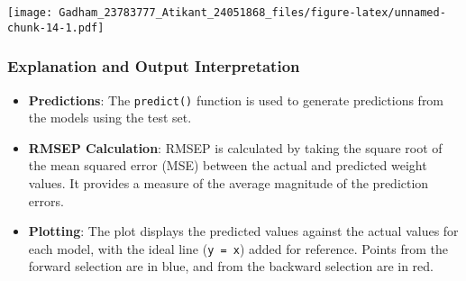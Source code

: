 \documentclass[
]{article}
\newenvironment{Shaded}{\begin{snugshade}}{\end{snugshade}}
\newcommand{\AttributeTok}[1]{\textcolor[rgb]{0.13,0.29,0.53}{#1}}
\newcommand{\CommentTok}[1]{\textcolor[rgb]{0.56,0.35,0.01}{\textit{#1}}}
\newcommand{\DecValTok}[1]{\textcolor[rgb]{0.00,0.00,0.81}{#1}}
\newcommand{\FunctionTok}[1]{\textcolor[rgb]{0.13,0.29,0.53}{\textbf{#1}}}
\newcommand{\NormalTok}[1]{#1}
\newcommand{\SpecialCharTok}[1]{\textcolor[rgb]{0.81,0.36,0.00}{\textbf{#1}}}
\newcommand{\StringTok}[1]{\textcolor[rgb]{0.31,0.60,0.02}{#1}}
\providecommand{\tightlist}{%
  \setlength{\itemsep}{0pt}\setlength{\parskip}{0pt}}
\begin{document}
\begin{Shaded}
\end{Shaded}

\texttt{[image: Gadham\_23783777\_Atikant\_24051868\_files/figure-latex/unnamed-chunk-14-1.pdf]}

\hypertarget{explanation-and-output-interpretation-1}{%
\subsubsection{Explanation and Output
Interpretation}\label{explanation-and-output-interpretation-1}}

\begin{itemize}
\tightlist
\item
  \textbf{Predictions}: The \texttt{predict()} function is used to
  generate predictions from the models using the test set.
\item
  \textbf{RMSEP Calculation}: RMSEP is calculated by taking the square
  root of the mean squared error (MSE) between the actual and predicted
  weight values. It provides a measure of the average magnitude of the
  prediction errors.
\item
  \textbf{Plotting}: The plot displays the predicted values against the
  actual values for each model, with the ideal line (\texttt{y\ =\ x})
  added for reference. Points from the forward selection are in blue,
  and from the backward selection are in red.
\end{itemize}
\end{document}
